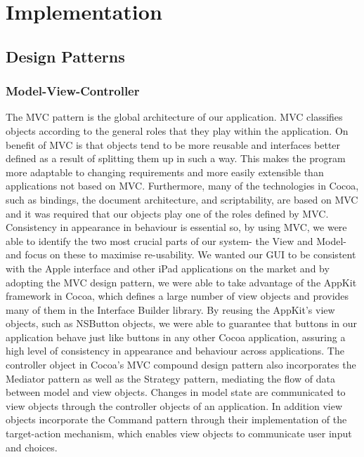 \documentclass[a4wide, 10pt]{article}
\begin{document}
\section{Implementation}

\subsection{Design Patterns}

\subsubsection{Model-View-Controller}

The MVC pattern is the global architecture of our application. MVC classifies objects according to the general roles that they play within the application. On benefit of MVC is that objects tend to be more reusable and interfaces better defined as a result of splitting them up in such a way. This makes the program more adaptable to changing requirements and more easily extensible than applications not based on MVC. Furthermore, many of the technologies in Cocoa, such as bindings, the document architecture, and scriptability, are based on MVC and it was required that our objects play one of the roles defined by MVC. Consistency in appearance in behaviour is essential so, by using MVC, we were able to identify the two most crucial parts of our system- the View and Model- and focus on these to maximise re-usability.  We wanted our GUI to be consistent with the Apple interface and other iPad applications on the market and by adopting the MVC design pattern, we were able to take advantage of the AppKit framework in Cocoa, which defines a large number of view objects and provides many of them in the Interface Builder library. By reusing the AppKit's view objects, such as NSButton objects, we were able to guarantee that buttons in our application behave just like buttons in any other Cocoa application, assuring a high level of consistency in appearance and behaviour across applications. The controller object in Cocoa's MVC compound design pattern also incorporates the Mediator pattern as well as the Strategy pattern, mediating the flow of data between model and view objects. Changes in model state are communicated to view objects through the controller objects of an application. In addition view objects incorporate the Command pattern through their implementation of the target-action mechanism, which enables view objects to communicate user input and choices.
\end{document}
